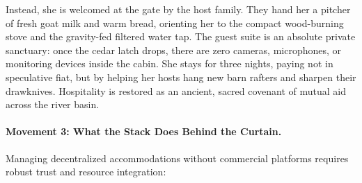 Instead, she is welcomed at the gate by the host family. They hand her a pitcher of fresh goat milk and warm bread, orienting her to the compact wood-burning stove and the gravity-fed filtered water tap. The guest suite is an absolute private sanctuary: once the cedar latch drops, there are zero cameras, microphones, or monitoring devices inside the cabin. She stays for three nights, paying not in speculative fiat, but by helping her hosts hang new barn rafters and sharpen their drawknives. Hospitality is restored as an ancient, sacred covenant of mutual aid across the river basin.

\paragraph{Movement 3: What the Stack Does Behind the Curtain.}
Managing decentralized accommodations without commercial platforms requires robust trust and resource integration:
